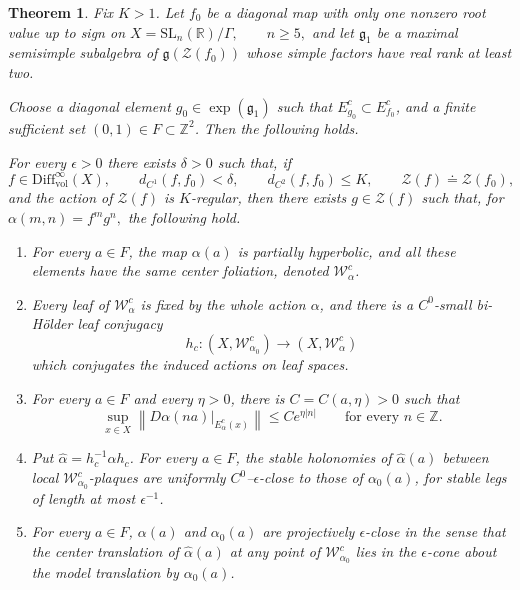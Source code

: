 \documentclass[11pt]{amsart}
\numberwithin{equation}{section}
\newcommand{\W}{\mathcal{W}}
\newcommand{\SL}{\mathrm{SL}}
\newcommand{\Diff}{\mathrm{Diff}}
\theoremstyle{plain}
\newtheorem{thm}{Theorem}[section]
\begin{document}
\begin{thm}\label{thm:highrankgph}
Fix $K>1$. Let $f_0$ be a diagonal map with only one nonzero root value
up to sign on
$
X=\SL_n(\mathbb R)/\Gamma,\qquad n\ge5,
$
and let $\mathfrak g_1$ be a maximal semisimple subalgebra of
$\mathfrak g(\mathcal Z(f_0))$ whose simple factors have real rank at
least two.


Choose a diagonal element
$g_0\in\exp(\mathfrak g_1)$ such that $E^c_{g_0}\subset E^c_{f_0}$, and a finite sufficient set
$(0,1)\in F\subset\mathbb Z^2$.
Then the following holds.


For every $\epsilon>0$ there exists $\delta>0$ such that, if
\[
f\in\Diff^\infty_{\mathrm{vol}}(X),\qquad
d_{C^1}(f,f_0)<\delta,\qquad
d_{C^2}(f,f_0)\le K,\qquad
\mathcal Z(f)\doteq\mathcal Z(f_0),
\]
and the action of $\mathcal Z(f)$ is $K$-regular, then there exists
$g\in\mathcal Z(f)$ such that, for
$
\alpha(m,n)=f^m g^n,
$
the following hold.

\begin{enumerate}
\item For every $a\in F$, the map $\alpha(a)$ is
partially hyperbolic, and all these elements have the same center
foliation, denoted $\mathcal W_\alpha^c$.

\item Every leaf of $\mathcal W_\alpha^c$ is fixed by the whole action
$\alpha$, and there is a $C^0$-small bi-H\"older leaf conjugacy
\[
h_c:(X,\mathcal W_{\alpha_0}^c)\longrightarrow
     (X,\mathcal W_\alpha^c)
\]
which conjugates the induced actions on leaf spaces.

\item For every $a\in F$ and every $\eta>0$, there is
$C=C(a,\eta)>0$ such that
\[
\sup_{x\in X}
\left\|D\alpha(na)|_{E_\alpha^c(x)}\right\|
\le Ce^{\eta|n|}
\qquad\text{for every }n\in\mathbb Z.
\]

\item Put $\widehat\alpha=h_c^{-1}\alpha h_c$. For every
$a\in F$, the stable holonomies of $\widehat\alpha(a)$
between local $\mathcal W_{\alpha_0}^c$-plaques are uniformly
$C^0$--$\epsilon$-close to those of $\alpha_0(a)$, for stable legs
of length at most $\epsilon^{-1}$.

\item For every $a\in F$, $\alpha(a)$ and $\alpha_0(a)$ are
projectively $\epsilon$-close in the sense that the center
translation of $\widehat\alpha(a)$ at any point of $\W_{\alpha_0}^c$
lies in the $\epsilon$-cone about the model translation by $\alpha_0(a)$.
\end{enumerate}
\end{thm}
\end{document}
